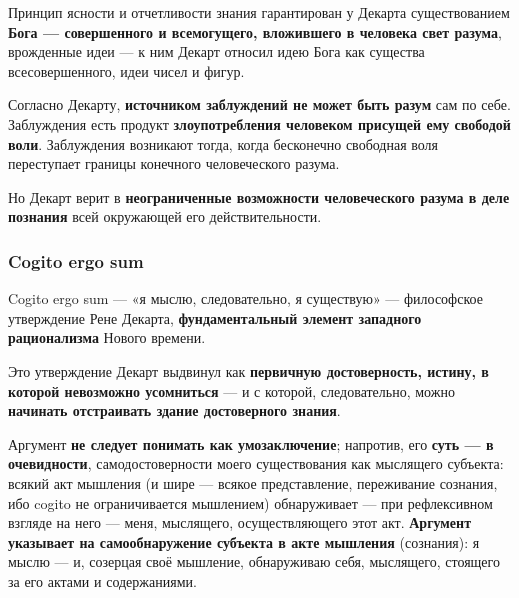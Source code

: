 \documentclass{article}
\begin{document}
\begin{flushleft}
\hfill

Принцип ясности и отчетливости знания гарантирован у Декарта существованием \textbf{Бога — совершенного и всемогущего, вложившего в человека свет разума}, врожденные идеи — к ним Декарт относил идею Бога как существа всесовершенного, идеи чисел и фигур.

\hfill

Согласно Декарту, \textbf{источником заблуждений не может быть разум} сам по себе. Заблуждения есть продукт \textbf{злоупотребления человеком присущей ему свободой воли}. Заблуждения возникают тогда, когда бесконечно свободная воля переступает границы конечного человеческого разума.

Но Декарт верит в \textbf{неограниченные возможности человеческого разума в деле познания} всей окружающей его действительности.

\subsubsection{Cogito ergo sum}

Cogito ergo sum — «я мыслю, следовательно, я существую» — философское утверждение Рене Декарта, \textbf{фундаментальный элемент западного рационализма} Нового времени.

\hfill

Это утверждение Декарт выдвинул как \textbf{первичную достоверность, истину, в которой невозможно усомниться} — и с которой, следовательно, можно \textbf{начинать отстраивать здание достоверного знания}.

\hfill

Аргумент \textbf{не следует понимать как умозаключение}; напротив, его \textbf{суть — в очевидности}, самодостоверности моего существования как мыслящего субъекта: всякий акт мышления (и шире — всякое представление, переживание сознания, ибо cogito не ограничивается мышлением) обнаруживает — при рефлексивном взгляде на него — меня, мыслящего, осуществляющего этот акт. \textbf{Аргумент указывает на самообнаружение субъекта в акте мышления} (сознания): я мыслю — и, созерцая своё мышление, обнаруживаю себя, мыслящего, стоящего за его актами и содержаниями.

\end{flushleft}
\end{document}
